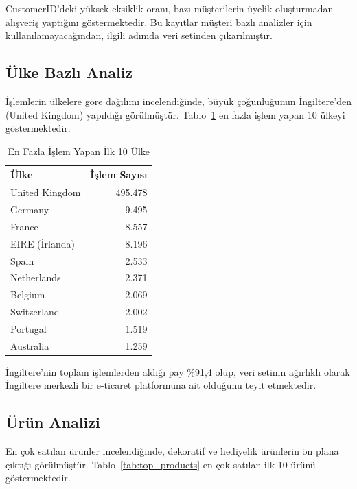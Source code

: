 \documentclass[conference]{IEEEtran}
\begin{document}
CustomerID'deki yüksek eksiklik oranı, bazı müşterilerin üyelik oluşturmadan alışveriş yaptığını göstermektedir. Bu kayıtlar müşteri bazlı analizler için kullanılamayacağından, ilgili adımda veri setinden çıkarılmıştır.

\subsection{Ülke Bazlı Analiz}

İşlemlerin ülkelere göre dağılımı incelendiğinde, büyük çoğunluğunun İngiltere'den (United Kingdom) yapıldığı görülmüştür. Tablo~\ref{tab:countries} en fazla işlem yapan 10 ülkeyi göstermektedir.

\begin{table}[h]
\centering
\caption{En Fazla İşlem Yapan İlk 10 Ülke}
\label{tab:countries}
\begin{tabular}{lr}
\toprule
\textbf{Ülke} & \textbf{İşlem Sayısı} \\
\midrule
United Kingdom & 495.478 \\
Germany & 9.495 \\
France & 8.557 \\
EIRE (İrlanda) & 8.196 \\
Spain & 2.533 \\
Netherlands & 2.371 \\
Belgium & 2.069 \\
Switzerland & 2.002 \\
Portugal & 1.519 \\
Australia & 1.259 \\
\bottomrule
\end{tabular}
\end{table}

İngiltere'nin toplam işlemlerden aldığı pay \%91,4 olup, veri setinin ağırlıklı olarak İngiltere merkezli bir e-ticaret platformuna ait olduğunu teyit etmektedir.

\subsection{Ürün Analizi}

En çok satılan ürünler incelendiğinde, dekoratif ve hediyelik ürünlerin ön plana çıktığı görülmüştür. Tablo~\ref{tab:top_products} en çok satılan ilk 10 ürünü göstermektedir.
\end{document}
